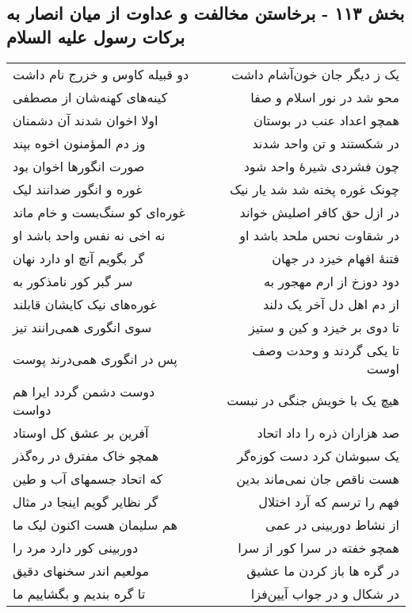 \begin{center}
\section*{بخش ۱۱۳ - برخاستن مخالفت و عداوت از میان انصار  به برکات رسول علیه السلام}
\label{sec:sh113}
\begin{longtable}{l p{0.5cm} r}
دو قبیله کاوس و خزرج نام داشت
&&
یک ز دیگر جان خون‌آشام داشت
\\
کینه‌های کهنه‌شان از مصطفی
&&
محو شد در نور اسلام و صفا
\\
اولا اخوان شدند آن دشمنان
&&
همچو اعداد عنب در بوستان
\\
وز دم المؤمنون اخوه بپند
&&
در شکستند و تن واحد شدند
\\
صورت انگورها اخوان بود
&&
چون فشردی شیرهٔ واحد شود
\\
غوره و انگور ضدانند لیک
&&
چونک غوره پخته شد شد یار نیک
\\
غوره‌ای کو سنگ‌بست و خام ماند
&&
در ازل حق کافر اصلیش خواند
\\
نه اخی نه نفس واحد باشد او
&&
در شقاوت نحس ملحد باشد او
\\
گر بگویم آنچ او دارد نهان
&&
فتنهٔ افهام خیزد در جهان
\\
سر گبر کور نامذکور به
&&
دود دوزخ از ارم مهجور به
\\
غوره‌های نیک کایشان قابلند
&&
از دم اهل دل آخر یک دلند
\\
سوی انگوری همی‌رانند تیز
&&
تا دوی بر خیزد و کین و ستیز
\\
پس در انگوری همی‌درند پوست
&&
تا یکی گردند و وحدت وصف اوست
\\
دوست دشمن گردد ایرا هم دواست
&&
هیچ یک با خویش جنگی در نبست
\\
آفرین بر عشق کل اوستاد
&&
صد هزاران ذره را داد اتحاد
\\
همچو خاک مفترق در ره‌گذر
&&
یک سبوشان کرد دست کوزه‌گر
\\
که اتحاد جسمهای آب و طین
&&
هست ناقص جان نمی‌ماند بدین
\\
گر نظایر گویم اینجا در مثال
&&
فهم را ترسم که آرد اختلال
\\
هم سلیمان هست اکنون لیک ما
&&
از نشاط دوربینی در عمی
\\
دوربینی کور دارد مرد را
&&
همچو خفته در سرا کور از سرا
\\
مولعیم اندر سخنهای دقیق
&&
در گره ها باز کردن ما عشیق
\\
تا گره بندیم و بگشاییم ما
&&
در شکال و در جواب آیین‌فزا
\\

\end{longtable}
\end{center}
